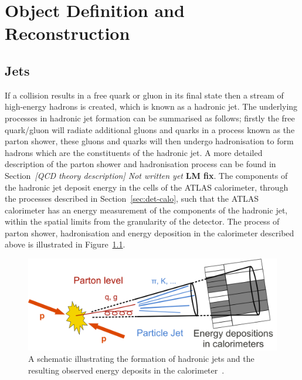 \chapter{Object Definition and Reconstruction}
\label{sec:obj}

\section{Jets}
\label{sec:obj-jets}

If a collision results in a free quark or gluon in its final state then a stream of high-energy hadrons is created,
which is known as a hadronic jet.
The underlying processes in hadronic jet formation can be summarised as follows;
firstly the free quark/gluon will radiate additional gluons and quarks in a process known as the parton shower,
these gluons and quarks will then undergo hadronisation to form hadrons which are the constituents of the hadronic jet.
A more detailed description of the parton shower and hadronisation process can be found in Section~\textit{[QCD theory description] Not written yet} \textbf{LM fix}.
The components of the hadronic jet deposit energy in the cells of the ATLAS calorimeter, through the processes described in Section~\ref{sec:det-calo},
such that the ATLAS calorimeter has an energy measurement of the components of the hadronic jet, within the spatial limits from the granularity of the detector.
The process of parton shower, hadronisation and energy deposition in the calorimeter  described above is illustrated in Figure~\ref{fig:obj-jet_schem}. \\

\begin{figure}[!ht]
  \begin{center}
    \includegraphics[width=1\linewidth, angle=0]{figs/Objects/jet_schem.png}
  \end{center}
  \caption[A schematic illustrating the formation of hadronic jets and the resulting observed energy deposits in the calorimeter.]
          {A schematic illustrating the formation of hadronic jets and the resulting observed energy deposits in the calorimeter~\cite{obj-jet_schem}.}
  \label{fig:obj-jet_schem}
\end{figure}


